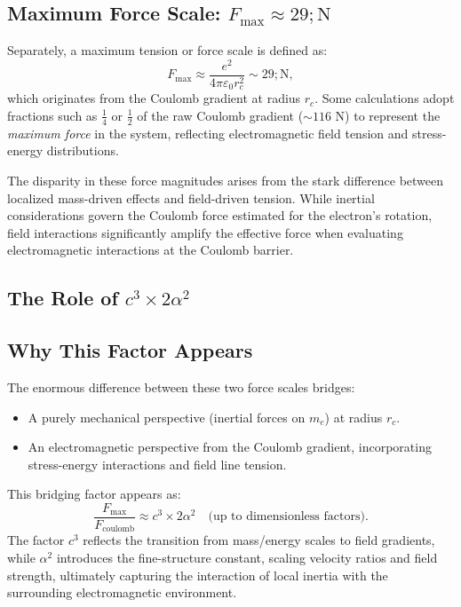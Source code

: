 \documentclass[a4paper,10pt]{article}
\begin{document}
\subsection*{Maximum Force Scale: $F_{\max} \approx 29 ; \mathrm{N}$}


Separately, a maximum tension or force scale is defined as:
\begin{equation*}
F_{\max} \approx \frac{e^2}{4\pi \varepsilon_0 r_c^2} \sim 29 ; \mathrm{N},
\end{equation*}
which originates from the Coulomb gradient at radius $r_c$. Some calculations adopt fractions such as $\frac{1}{4}$ or $\frac{1}{2}$ of the raw Coulomb gradient ($\sim 116$ N) to represent the \textit{maximum force} in the system, reflecting electromagnetic field tension and stress-energy distributions.


The disparity in these force magnitudes arises from the stark difference between localized mass-driven effects and field-driven tension. While inertial considerations govern the Coulomb force estimated for the electron's rotation, field interactions significantly amplify the effective force when evaluating electromagnetic interactions at the Coulomb barrier.


\subsection*{The Role of $c^3 \times 2 \alpha^2$}


\subsection*{Why This Factor Appears}


The enormous difference between these two force scales bridges:
\begin{itemize}
\item A purely mechanical perspective (inertial forces on $m_e$) at radius $r_c$.
\item An electromagnetic perspective from the Coulomb gradient, incorporating stress-energy interactions and field line tension.
\end{itemize}
This bridging factor appears as:
\begin{equation*}
\frac{F_{\max}}{F_\text{coulomb}} \approx c^3 \times 2 \alpha^2 \quad \text{(up to dimensionless factors)}.
\end{equation*}
The factor $c^3$ reflects the transition from mass/energy scales to field gradients, while $\alpha^2$ introduces the fine-structure constant, scaling velocity ratios and field strength, ultimately capturing the interaction of local inertia with the surrounding electromagnetic environment.
\end{document}
